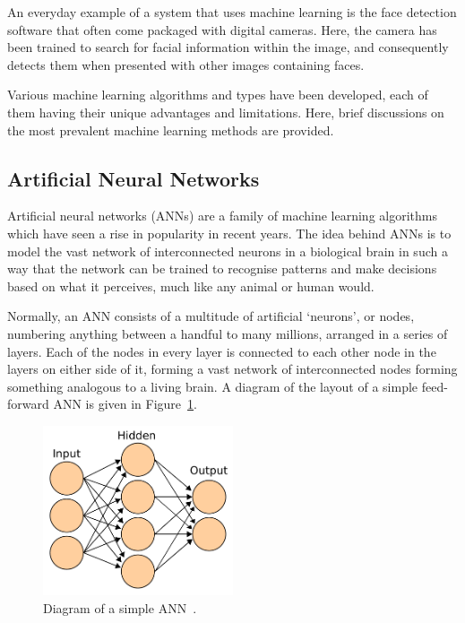 An everyday example of a system that uses machine learning is the face detection software that often come packaged with digital cameras. Here, the camera has been trained to search for facial information within the image, and consequently detects them when presented with other images containing faces.

Various machine learning algorithms and types have been developed, each of them having their unique advantages and limitations. Here, brief discussions on the most prevalent machine learning methods are provided. 

\subsection{Artificial Neural Networks}

Artificial neural networks (ANNs) are a family of machine learning algorithms which have seen a rise in popularity in recent years. The idea behind ANNs is to model the vast network of interconnected neurons in a biological brain in such a way that the network can be trained to recognise patterns and make decisions based on what it perceives, much like any animal or human would. 

Normally, an ANN consists of a multitude of artificial `neurons', or nodes, numbering anything between a handful to many millions, arranged in a series of layers. Each of the nodes in every layer is connected to each other node in the layers on either side of it, forming a vast network of interconnected nodes forming something analogous to a living brain. A diagram of the layout of a simple feed-forward ANN is given in Figure~\ref{fig:chap2-ann-layout}.

\begin{figure}
  \centering
  \includegraphics[width=0.5\textwidth]{figures/chapter2/ANN_diagram}
  \caption[Diagram of a simple ANN.]{Diagram of a simple ANN~\citep{ann-wiki-pic}.}
\label{fig:chap2-ann-layout}
\end{figure}

